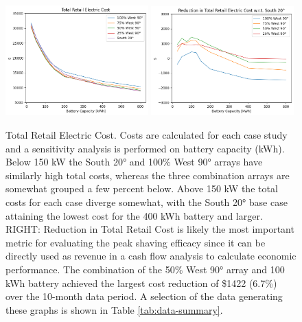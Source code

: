 \documentclass[journal,article,submit,pdftex,moreauthors]{Definitions/mdpi}
\begin{document}
\begin{figure}[!h]
  \centering
  \includegraphics[width=0.49\textwidth]{./images/total cost.png}
  \includegraphics[width=0.49\textwidth]{./images/total cost reduction.png}
  \caption{Total Retail Electric Cost. Costs are calculated for each case study and a sensitivity analysis is performed on battery capacity (kWh). Below 150 kW the South 20° and 100\% West 90° arrays have similarly high total costs, whereas the three combination arrays are somewhat grouped a few percent below. Above 150 kW the total costs for each case diverge somewhat, with the South 20° base case attaining the lowest cost for the 400 kWh battery and larger. RIGHT: Reduction in Total Retail Cost is likely the most important metric for evaluating the peak shaving efficacy since it can be directly used as revenue in a cash flow analysis to calculate economic performance. The combination of the 50\% West 90° array and 100 kWh battery achieved the largest cost reduction of \$1422 (6.7\%) over the 10-month data period. A selection of the data generating these graphs is shown in Table \ref{tab:data-summary}.}
  \label{fig:total-cost}
\end{figure}
\end{document}
